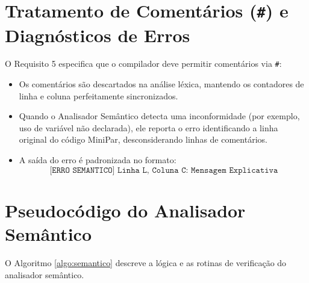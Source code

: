 \section{Tratamento de Comentários (\texttt{\#}) e Diagnósticos de Erros}

O Requisito 5 especifica que o compilador deve permitir comentários via \texttt{\#}:
\begin{itemize}
    \item Os comentários são descartados na análise léxica, mantendo os contadores de linha e coluna perfeitamente sincronizados.
    \item Quando o Analisador Semântico detecta uma inconformidade (por exemplo, uso de variável não declarada), ele reporta o erro identificando a linha original do código MiniPar, desconsiderando linhas de comentários.
    \item A saída do erro é padronizada no formato:
    \[ \texttt{[ERRO SEMANTICO] Linha L, Coluna C: Mensagem Explicativa} \]
\end{itemize}

\section{Pseudocódigo do Analisador Semântico}

O Algoritmo \ref{algo:semantico} descreve a lógica e as rotinas de verificação do analisador semântico.

